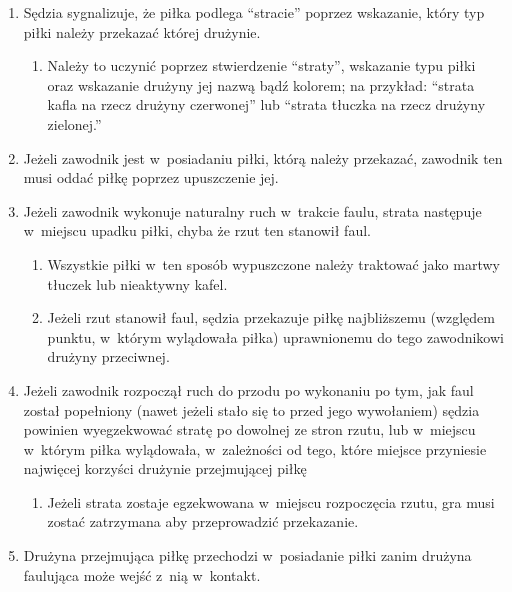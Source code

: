\documentclass[12pt]{article}
\begin{document}
\begin{enumerate}
	\item
	      Sędzia sygnalizuje, że piłka podlega ``stracie'' poprzez wskazanie,
	      który typ piłki należy przekazać której drużynie.

	      \begin{enumerate}
		      \item
		            Należy to uczynić poprzez stwierdzenie ``straty'', wskazanie typu
		            piłki oraz wskazanie drużyny jej nazwą bądź kolorem; na przykład:
		            ``strata kafla na rzecz drużyny czerwonej'' lub ``strata tłuczka na
		            rzecz drużyny zielonej.''
	      \end{enumerate}
	\item
	      Jeżeli zawodnik jest w~posiadaniu piłki, którą należy przekazać,
	      zawodnik ten musi oddać piłkę poprzez upuszczenie jej.
	\item
	      Jeżeli zawodnik wykonuje naturalny ruch w~trakcie faulu, strata
	      następuje w~miejscu upadku piłki, chyba że rzut ten stanowił faul.

	      \begin{enumerate}
		      \item
		            Wszystkie piłki w~ten sposób wypuszczone należy traktować jako
		            martwy tłuczek lub nieaktywny kafel.
		      \item
		            Jeżeli rzut stanowił faul, sędzia przekazuje piłkę najbliższemu
		            (względem punktu, w~którym wylądowała piłka) uprawnionemu do tego
		            zawodnikowi drużyny przeciwnej.
	      \end{enumerate}
	\item
	      Jeżeli zawodnik rozpoczął ruch do przodu po wykonaniu po tym, jak faul
	      został popełniony (nawet jeżeli stało się to przed jego wywołaniem)
	      sędzia powinien wyegzekwować stratę po dowolnej ze stron rzutu, lub w~miejscu w~którym piłka wylądowała, w~zależności od tego, które miejsce
	      przyniesie najwięcej korzyści drużynie przejmującej piłkę

	      \begin{enumerate}
		      \item
		            Jeżeli strata zostaje egzekwowana w~miejscu rozpoczęcia rzutu, gra
		            musi zostać zatrzymana aby przeprowadzić przekazanie.
	      \end{enumerate}
	\item
	      Drużyna przejmująca piłkę przechodzi w~posiadanie piłki zanim drużyna
	      faulująca może wejść z~nią w~kontakt.


\end{enumerate}
\end{document}
